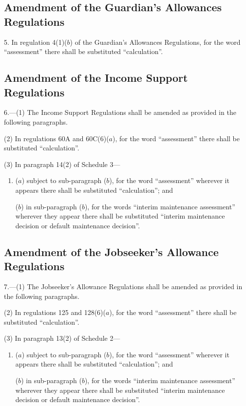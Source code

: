 \documentclass[12pt,a4paper]{article}
\begin{document}

\subsection[5. Amendment of the Guardian’s Allowances Regulations]{Amendment of the Guardian’s Allowances Regulations}

5.  In regulation 4(1)($b$)  of the Guardian’s Allowances Regulations, for the word “assessment” there shall be substituted “calculation”.

\subsection[6. Amendment of the Income Support Regulations]{Amendment of the Income Support Regulations}

6.---(1)  The Income Support Regulations shall be amended as provided in the following paragraphs.

(2) In regulations 60A and 60C(6)($a$), for the word “assessment” there shall be substituted “calculation”.

(3) In paragraph 14(2) of Schedule 3—
\begin{enumerate}\item[]
($a$) subject to sub-paragraph ($b$), for the word “assessment” wherever it appears there shall be substituted “calculation”; and

($b$) in sub-paragraph ($b$), for the words “interim maintenance assessment” wherever they appear there shall be substituted “interim maintenance decision or default maintenance decision”.
\end{enumerate}

\subsection[7. Amendment of the Jobseeker’s Allowance Regulations]{Amendment of the Jobseeker’s Allowance Regulations}

7.---(1)  The Jobseeker’s Allowance Regulations shall be amended as provided in the following paragraphs.

(2) In regulations 125 and 128(6)($a$), for the word “assessment” there shall be substituted “calculation”.

(3) In paragraph 13(2) of Schedule 2—
\begin{enumerate}\item[]
($a$) subject to sub-paragraph ($b$), for the word “assessment” wherever it appears there shall be substituted “calculation”; and

($b$) in sub-paragraph ($b$), for the words “interim maintenance assessment” wherever they appear there shall be substituted “interim maintenance decision or default maintenance decision”.
\end{enumerate}
\end{document}
